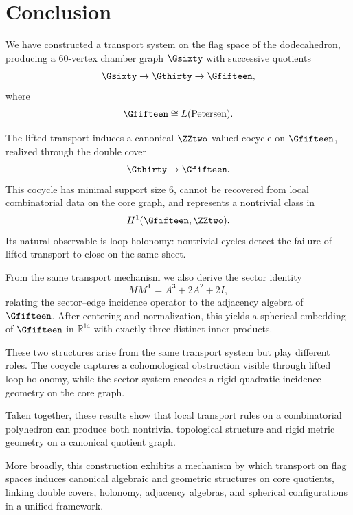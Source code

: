 \section{Conclusion}

We have constructed a transport system on the flag space of the
dodecahedron, producing a $60$-vertex chamber graph $\Gsixty$ with
successive quotients
\[
\Gsixty \to \Gthirty \to \Gfifteen,
\]
where
\[
\Gfifteen \cong L(\mathrm{Petersen}).
\]

The lifted transport induces a canonical $\ZZtwo$-valued cocycle on
$\Gfifteen$, realized through the double cover
\[
\Gthirty \to \Gfifteen.
\]
This cocycle has minimal support size $6$, cannot be recovered from local
combinatorial data on the core graph, and represents a nontrivial class in
\[
H^1(\Gfifteen,\ZZtwo).
\]
Its natural observable is loop holonomy: nontrivial cycles detect the
failure of lifted transport to close on the same sheet.

From the same transport mechanism we also derive the sector identity
\[
M M^{\mathsf T} = A^3 + 2A^2 + 2I,
\]
relating the sector--edge incidence operator to the adjacency algebra of
$\Gfifteen$. After centering and normalization, this yields a spherical
embedding of $\Gfifteen$ in $\mathbb{R}^{14}$ with exactly three distinct
inner products.

These two structures arise from the same transport system but play
different roles. The cocycle captures a cohomological obstruction visible
through lifted loop holonomy, while the sector system encodes a rigid
quadratic incidence geometry on the core graph.

Taken together, these results show that local transport rules on a
combinatorial polyhedron can produce both nontrivial topological
structure and rigid metric geometry on a canonical quotient graph.

More broadly, this construction exhibits a mechanism by which transport on
flag spaces induces canonical algebraic and geometric structures on core
quotients, linking double covers, holonomy, adjacency algebras, and
spherical configurations in a unified framework.

